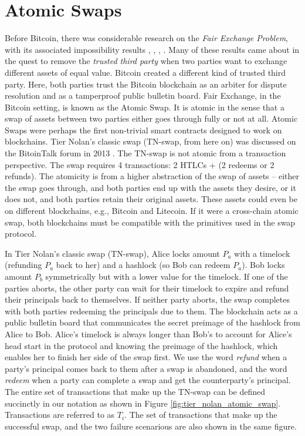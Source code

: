 \section{Atomic Swaps}
Before Bitcoin, there was considerable research on the \textit{Fair Exchange Problem}, with its associated impossibility results \cite{cleve1986limits}, \cite{fair_exchange_impossibility}, \cite{franklin1997fair}, \cite{asokan1998optimistic}. Many of these results came about in the quest to remove the \textit{trusted third party} when two parties want to exchange different assets of equal value. Bitcoin created a different kind of trusted third party. Here, both parties trust the Bitcoin blockchain as an arbiter for dispute resolution and as a tamperproof public bulletin board. Fair Exchange, in the Bitcoin setting, is known as the Atomic Swap. It is atomic in the sense that a swap of assets between two parties either goes through fully or not at all. Atomic Swaps were perhaps the first non-trivial smart contracts designed to work on blockchains. Tier Nolan's classic swap (TN-swap, from here on) was discussed on the BitoinTalk forum in 2013 \cite{atomic_swap}. The TN-swap is not atomic from a transaction perspective. The swap requires 4 transactions: 2 HTLCs + (2 redeems or 2 refunds). The atomicity is from a higher abstraction of the swap of assets -- either the swap goes through, and both parties end up with the assets they desire, or it does not, and both parties retain their original assets. These assets could even be on different blockchains, e.g., Bitcoin and Litecoin. If it were a cross-chain atomic swap, both blockchains must be compatible with the primitives used in the swap protocol. 

In Tier Nolan's classic swap (TN-swap), Alice locks amount $P_a$ with a timelock (refunding $P_a$ back to her) and a hashlock (so Bob can redeem $P_a$). Bob locks amount $P_b$ symmetrically but with a lower value for the timelock. If one of the parties aborts, the other party can wait for their timelock to expire and refund their principals back to themselves. If neither party aborts, the swap completes with both parties redeeming the principals due to them. The blockchain acts as a public bulletin board that communicates the secret preimage of the hashlock from Alice to Bob. Alice's timelock is always longer than Bob's to account for Alice's head start in the protocol and knowing the preimage of the hashlock, which enables her to finish her side of the swap first. We use the word \textit{refund} when a party's principal comes back to them after a swap is abandoned, and the word \textit{redeem} when a party can complete a swap and get the counterparty's principal. The entire set of transactions that make up the TN-swap can be defined succinctly in our notation as shown in Figure \ref{fig:tier_nolan_atomic_swap}. Transactions are referred to as $T_i$. The set of transactions that make up the successful swap, and the two failure scenarious are also shown in the same figure.

